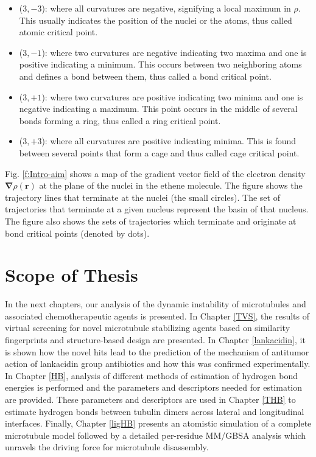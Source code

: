 \documentclass[11pt]{report}
\begin{document}
\begin{itemize}
 \item ($3,-3$): where all curvatures are negative, signifying a local maximum in $\rho$. This 
usually indicates the position of the nuclei or the atoms, thus called atomic 
critical point.

\item ($3,-1$): where two curvatures are negative indicating two maxima 
and one is positive indicating a minimum. This occurs between two neighboring atoms and defines a bond between them, thus called a bond critical point.

\item ($3,+1$): where two curvatures are positive indicating two minima 
and one is negative indicating a maximum. This point occurs in the middle 
of several bonds forming a ring, thus called a ring critical point.

\item ($3,+3$): where all curvatures are positive indicating minima. This
is found between several points that form a cage and thus called cage critical point.
\end{itemize}

Fig. \ref{f:Intro-aim} shows a map of the gradient vector field of the electron
density $\mathbf{\nabla}\rho(\mathbf{r})$ at the plane of the nuclei in the ethene molecule. The figure
shows the trajectory lines that terminate at the nuclei (the small circles).
The set of trajectories that terminate at a given nucleus represent the basin of that nucleus. The figure also shows the sets of trajectories
which terminate and originate at bond critical points (denoted by dots).

\section{Scope of Thesis}
In the next chapters, our analysis of the dynamic instability of microtubules
and associated chemotherapeutic agents is presented. In Chapter \ref{TVS},
the results of virtual screening  for novel microtubule
stabilizing agents based on similarity fingerprints and structure-based 
design are presented. In Chapter \ref{lankacidin}, it is shown how the novel hits lead to
the prediction of the mechanism of antitumor action of lankacidin group
antibiotics and how this was confirmed experimentally. In Chapter \ref{HB},
analysis of different methods of estimation of hydrogen bond energies
is performed and the parameters and descriptors needed for estimation
are provided. These parameters and descriptors are used in Chapter
\ref{THB} to estimate hydrogen bonds between tubulin dimers 
across lateral and longitudinal interfaces. Finally, Chapter \ref{ligHB}
presents an atomistic simulation of a complete microtubule model
followed by a detailed per-residue MM/GBSA analysis which unravels the
driving force for microtubule disassembly.
\end{document}
